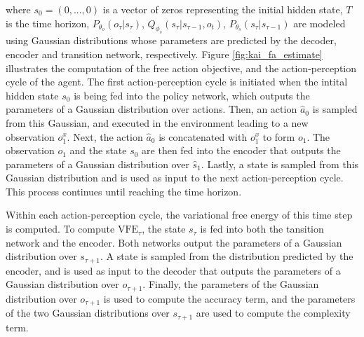 \documentclass[twoside,11pt]{article}
\begin{document}
where $s_0 = (0, ..., 0)$ is a vector of zeros representing the initial hidden state, $T$ is the time horizon, $P_{\theta_o}(o_\tau|s_\tau)$, $Q_{\phi_s}(s_\tau|s_{\tau-1}, o_t)$, $P_{\theta_s}(s_\tau|s_{\tau-1})$ are modeled using Gaussian distributions whose parameters are predicted by the decoder, encoder and transition network, respectively. Figure \ref{fig:kai_fa_estimate} illustrates the computation of the free action objective, and the action-perception cycle of the agent. The first action-perception cycle is initiated when the intital hidden state $s_0$ is being fed into the policy network, which outputs the parameters of a Gaussian distribution over actions. Then, an action $\hat{a}_0$ is sampled from this Gaussian, and executed in the environment leading to a new observation $o_1^x$. Next, the action $\hat{a}_0$ is concatenated with $o_1^x$ to form $o_1$. The observation $o_1$ and the state $s_0$ are then fed into the encoder that outputs the parameters of a Gaussian distribution over $\hat{s}_1$. Lastly, a state is sampled from this Gaussian distribution and is used as input to the next action-perception cycle. This process continues until reaching the time horizon.

Within each action-perception cycle, the variational free energy of this time step is computed. To compute $\text{VFE}_\tau$, the state $s_\tau$  is fed into both the tansition network and the encoder. Both networks output the parameters of a Gaussian distribution over $s_{\tau+1}$. A state is sampled from the distribution predicted by the encoder, and is used as input to the decoder that outputs the parameters of a Gaussian distribution over $o_{\tau + 1}$. Finally, the parameters of the Gaussian distribution over $o_{\tau + 1}$ is used to compute the accuracy term, and the parameters of the two Gaussian distributions over $s_{\tau+1}$ are used to compute the complexity term.
\end{document}

